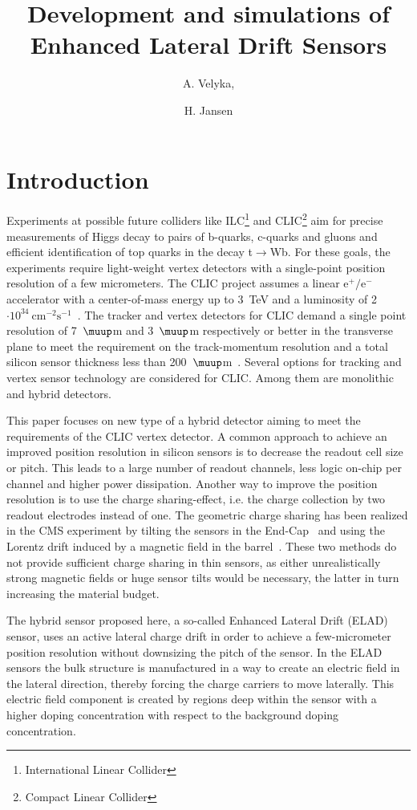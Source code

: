 \documentclass[a4paper,11pt]{article}
\title{Development and simulations of Enhanced Lateral Drift Sensors}
\author[a,1]{A. Velyka,\note{Corresponding author.}}
\author[a]{H. Jansen}
\affiliation[a]{Deutsches Elektronen-Synchrotron DESY,\\Notkestra\ss e 85, 22607 Hamburg, Germany}
\begin{document}
\maketitle
\flushbottom

\section{Introduction}
\label{sec:intro}
Experiments at possible future colliders like ILC\footnote{International Linear Collider} and CLIC\footnote{Compact Linear Collider} aim for precise measurements of Higgs decay to pairs of b-quarks,
 c-quarks and gluons and efficient identification of top quarks in the decay t$\mathrm{\rightarrow}$Wb.
For these goals, the experiments require light-weight vertex detectors with a single-point position resolution of a few micrometers. 
The CLIC project assumes a linear $\mathrm{e^+/e^-}$ accelerator with a center-of-mass energy up to 3~TeV and a luminosity of 2$\mathrm{\cdot10^{34}~cm^{-2}s^{-1}}$~\cite{cdr}.
The tracker and vertex detectors for CLIC demand a single point resolution of 7~$\muup$m and 3~$\muup$m respectively or better in the transverse plane
 to meet the requirement on the track-momentum resolution and a total silicon sensor thickness less than 200~$\muup$m~\cite{det}.
Several options for tracking and vertex sensor technology are considered for CLIC.
Among them are monolithic and hybrid detectors.

This paper focuses on new type of a hybrid detector aiming to meet the requirements of the CLIC vertex detector.
A common approach to achieve an improved position resolution in silicon sensors is to decrease the readout cell size or pitch.
This leads to a large number of readout channels, less logic on-chip per channel and higher power dissipation. 
Another way to improve the position resolution is to use the charge sharing-effect, i.e. the charge collection by two readout electrodes instead of one.
The geometric charge sharing has been realized in the CMS experiment by tilting the sensors in the End-Cap~\cite{simon} and using the Lorentz drift induced by a magnetic field in the barrel~\cite{tdr}.
These two methods do not provide sufficient charge sharing in thin sensors, as either unrealistically strong magnetic fields or huge sensor tilts would be necessary, the latter in turn increasing the material budget.

The hybrid sensor proposed here, a so-called Enhanced Lateral Drift (ELAD) sensor, uses an active lateral charge drift in order to achieve a few-micrometer position resolution without downsizing the pitch of the sensor.
In the ELAD sensors the bulk structure is manufactured in a way to create an electric field in the lateral direction, thereby forcing the charge carriers to move laterally. 
This electric field component is created by regions deep within the sensor with a higher doping concentration with respect to the background doping concentration.
\end{document}
